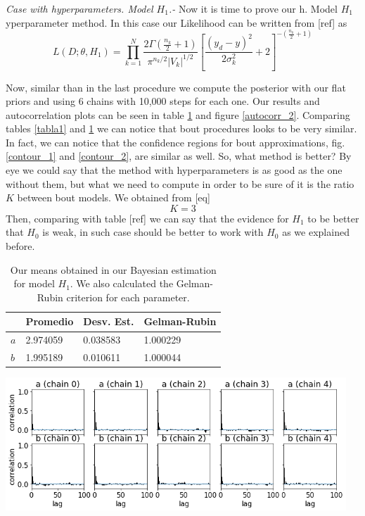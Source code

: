 \documentclass[onecolumn,           %
               showpacs,            %
               preprintnumbers,     %
               aps,                 %
               prl,          	    %
               letterpaper,             %
               superscriptaddress,      %
               nofootinbib,         %
               tightenlines,        %
               floats,floatfix      %
               ,usenatbib,
               ]{revtex4-1}
\begin{document}
\textit{Case with hyperparameters. Model $H_1$.-} Now it is time to prove our h. Model $H_1$yperparameter method. In this case our Likelihood can be written from [ref] as
\begin{equation}
L(D;\theta,H_1)=\prod_{k=1}^N\frac{2\Gamma(\frac{n_k}{2}+1)}{\pi^{n_k/2}|V_k|^{1/2}}\left[\frac{(y_d-y)^2}{2\sigma_k^2}+2\right]^{-\left(\frac{n_k}{2}+1\right)}
\end{equation}

Now, similar than in the last procedure we compute the posterior with our flat priors and using 6 chains with 10,000 steps for each one. Our results and autocorrelation plots can be seen in table \ref{tab} and figure \ref{autocorr_2}. Comparing tables \ref{tabla1} and \ref{tab} we can notice that bout procedures looks to be very similar. In fact, we can notice that the confidence regions for bout approximations, fig. \ref{contour_1} and \ref{contour_2}, are similar as well. So, what method is better? By eye we could say that the method with hyperparameters is as good as the one without them, but what we need to compute in order to be sure of it is the ratio $K$ between bout models. We obtained from [eq] 
\begin{equation}
K = 3
\end{equation}
Then, comparing with table [ref] we can say that the evidence for $H_1$ to be better that $H_0$ is weak, in such case should be better to work with $H_0$ as we explained before.

\begin{table}[h!]
\centering
\begin{tabular}{||l|l|l|l||} 
 \hline
 & \textbf{Promedio} & \textbf{Desv. Est.} & \textbf{Gelman-Rubin} \\ [0.5ex] 
 \hline\hline
$a$ & 2.974059 	 & 0.038583 & 1.000229 \\
\hline
$b$ & 1.995189 & 0.010611 	 & 1.000044\\ [1ex] 
 \hline
\end{tabular}
\caption{\footnotesize{Our means obtained in our Bayesian estimation for model $H_1$. We also calculated the Gelman-Rubin criterion for each parameter.}}
\label{tab}
\end{table}

\begin{minipage}{\textwidth}
\centering
\includegraphics[height=5cm]{Figures/autocorr_2.png}
\label{autocorr_2}
\end{minipage}
\\$ $
\end{document}
